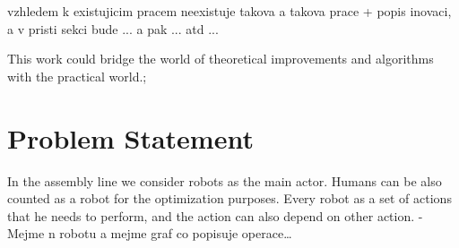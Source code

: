 vzhledem k existujicim pracem neexistuje takova a takova prace + popis inovaci, a v pristi sekci bude ... a pak ... atd ...

This work could bridge the world of theoretical improvements and algorithms with the practical world.; 

\section{Problem Statement}

In the assembly line we consider robots as the main actor. Humans can be also counted as a robot for the optimization purposes. Every robot as a set of actions that he needs to perform, and the action can also depend on other action. 
- Mejme n robotu a mejme graf co popisuje operace\ldots 
